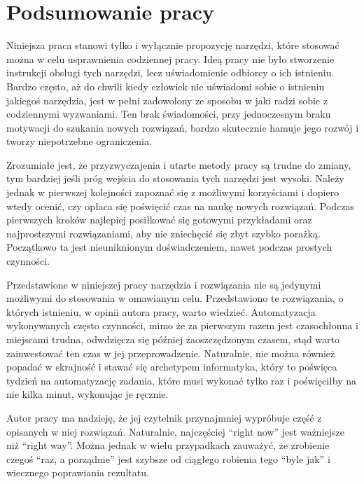 \chapter{Podsumowanie pracy}

Niniejsza praca stanowi tylko i wyłącznie propozycję narzędzi, które stosować można w celu usprawnienia codziennej pracy. Ideą pracy nie było stworzenie instrukcji obsługi tych narzędzi, lecz uświadomienie odbiorcy o ich istnieniu. Bardzo często, aż do chwili kiedy człowiek nie uświadomi sobie o istnieniu jakiegoś narzędzia, jest w pełni zadowolony ze sposobu w jaki radzi sobie z codziennymi wyzwaniami. Ten brak świadomości, przy jednoczesnym braku motywacji do szukania nowych rozwiązań, bardzo skutecznie hamuje jego rozwój i tworzy niepotrzebne ograniczenia.

Zrozumiałe jest, że przyzwyczajenia i utarte metody pracy są trudne do zmiany, tym bardziej jeśli próg wejścia do stosowania tych narzędzi jest wysoki. Należy jednak w pierwszej kolejności zapoznać się z możliwymi korzyściami i dopiero wtedy ocenić, czy opłaca się poświęcić czas na naukę nowych rozwiązań. Podczas pierwszych kroków najlepiej posiłkować się gotowymi przykładami oraz najprostszymi rozwiązaniami, aby nie zniechęcić się zbyt szybko porażką. Początkowo ta jest nieuniknionym doświadczeniem, nawet podczas prostych czynności.

Przedstawione w niniejszej pracy narzędzia i rozwiązania nie są jedynymi możliwymi do stosowania w omawianym celu. Przedstawiono te rozwiązania, o których istnieniu, w opinii autora pracy, warto wiedzieć. Automatyzacja wykonywanych często czynności, mimo że za pierwszym razem jest czasochłonna i miejscami trudna, odwdzięcza się później zaoszczędzonym czasem, stąd warto zainwestować ten czas w jej przeprowadzenie. Naturalnie, nie można również popadać w skrajność i stawać się archetypem informatyka, który to poświęca tydzień na automatyzację zadania, które musi wykonać tylko raz i poświęciłby na nie kilka minut, wykonując je ręcznie.

Autor pracy ma nadzieję, że jej czytelnik przynajmniej wypróbuje część z opisanych w niej rozwiązań. Naturalnie, najczęściej \enquote{right now} jest ważniejsze niż \enquote{right way}. Można jednak w wielu przypadkach zauważyć, że zrobienie czegoś \enquote{raz, a porządnie} jest szybsze od ciągłego robienia tego \enquote{byle jak} i wiecznego poprawiania rezultatu.
